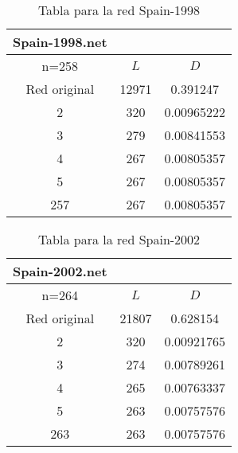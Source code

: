 \begin{minipage}{0.5\textwidth}
\begin{table}[H]
  \caption{Tabla para la red Spain-1998}
  \begin{tabular}{ccc}
  Spain-1998.net & & \\
  \hline
  n=258              &   $L$ &   $D$ \\
  \hline
  Red original &               12971 & 0.391247   \\
  2            &                 320 & 0.00965222 \\
  3            &                 279 & 0.00841553 \\
  4            &                 267 & 0.00805357 \\
  5            &                 267 & 0.00805357 \\
  257          &                 267 & 0.00805357 \\
  \hline
  \end{tabular}
\end{table}
\end{minipage}
\begin{minipage}{0.5\textwidth}
\begin{table}[H]
  \caption{Tabla para la red Spain-2002}
  \begin{tabular}{ccc}
    Spain-2002.net & & \\
    \hline
    n=264              &   $L$ &   $D$ \\
    \hline
    Red original &               21807 & 0.628154   \\
    2            &                 320 & 0.00921765 \\
    3            &                 274 & 0.00789261 \\
    4            &                 265 & 0.00763337 \\
    5            &                 263 & 0.00757576 \\
    263          &                 263 & 0.00757576 \\
    \hline
  \end{tabular}  
\end{table}
\end{minipage}

